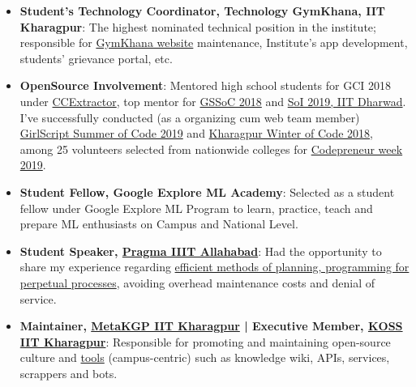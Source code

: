 \documentclass[a4paper,10pt]{extarticle} %
\begin{document}
\begin{itemize}[leftmargin=0.55cm, rightmargin=0.2cm, label={\Large\textbullet}]

\item \textbf{Student's Technology Coordinator, Technology GymKhana, IIT Kharagpur}: The highest nominated technical position in the institute; responsible for \href{http://gymkhana.iitkgp.ac.in/index.php}{GymKhana website} maintenance, Institute's app development, students' grievance portal, etc.

\item \textbf{OpenSource Involvement}: Mentored high school students for GCI 2018 under \href{https://codein.withgoogle.com/organizations/ccextractor-development/}{CCExtractor}, top mentor for \href{https://www.gssoc.tech/}{GSSoC 2018} and \href{https://oss2019.github.io/SoI.html}{SoI 2019, IIT Dharwad}. I've successfully conducted (as a organizing cum web team member) \href{https://gssoc.tech/}{GirlScript Summer of Code 2019} and \href{https://kwoc.kossiitkgp.org/}{Kharagpur Winter of Code 2018}, among 25 volunteers selected from nationwide colleges for \href{http://codepreneur.in}{Codepreneur week 2019}.

\item \textbf{Student Fellow, Google Explore ML Academy}: Selected as a student fellow under Google Explore ML Program to learn, practice, teach and prepare ML enthusiasts on Campus and National Level.

\item \textbf{Student Speaker, \href{http://pragmaconf.tech}{Pragma IIIT Allahabad}}: Had the opportunity to share my experience regarding \href{https://prezi.com/view/tf50MBbGtm9FgPKQfieI/}{efficient methods of planning, programming for perpetual processes}, avoiding overhead maintenance costs and denial of service.

\item \textbf{Maintainer, \href{https://wiki.metakgp.org/w/Metakgp:About}{MetaKGP IIT Kharagpur} | Executive Member, \href{https://kossiitkgp.org/about/index.html}{KOSS IIT Kharagpur}}: Responsible for promoting and maintaining open-source culture and \href{https://github.com/metakgp/}{tools} (campus-centric) such as knowledge wiki, APIs, services, scrappers and bots.
\end{itemize}
\end{document}
